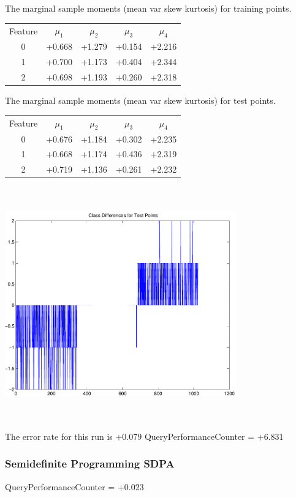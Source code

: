\documentclass[9pt]{article}
\theoremstyle{plain}
\theoremstyle{definition}
\theoremstyle{remark}
\numberwithin{equation}{section}
\begin{document}
The marginal sample moments (mean var skew kurtosis) for training points.\newline
\begin{tabular}{ c |  c  c  c  c}
Feature & $\mu_1$ & $\mu_2$ & $\mu_3$ & $\mu_4$ \\
0 & +0.668 & +1.279 & +0.154& +2.216 \\
\hline
1 & +0.700 & +1.173 & +0.404& +2.344 \\
\hline
2 & +0.698 & +1.193 & +0.260& +2.318 \\
\hline
\end{tabular}
\newline
The marginal sample moments (mean var skew kurtosis) for test points.\newline
\begin{tabular}{ c | c  c  c  c}
Feature & $\mu_1$ & $\mu_2$ & $\mu_3$ & $\mu_4$ \\
0 & +0.676 & +1.184 & +0.302& +2.235\\
\hline
1 & +0.668 & +1.174 & +0.436& +2.319\\
\hline
2 & +0.719 & +1.136 & +0.261& +2.232\\
\hline
\end{tabular}\newline
\includegraphics[width=10.0cm,height=10.0cm]{classDiffs.pdf}

The error rate for this run is +0.079\newline
QueryPerformanceCounter  =  +6.831
\subsubsection{Semidefinite Programming SDPA}
QueryPerformanceCounter  =  +0.023
\end{document}
